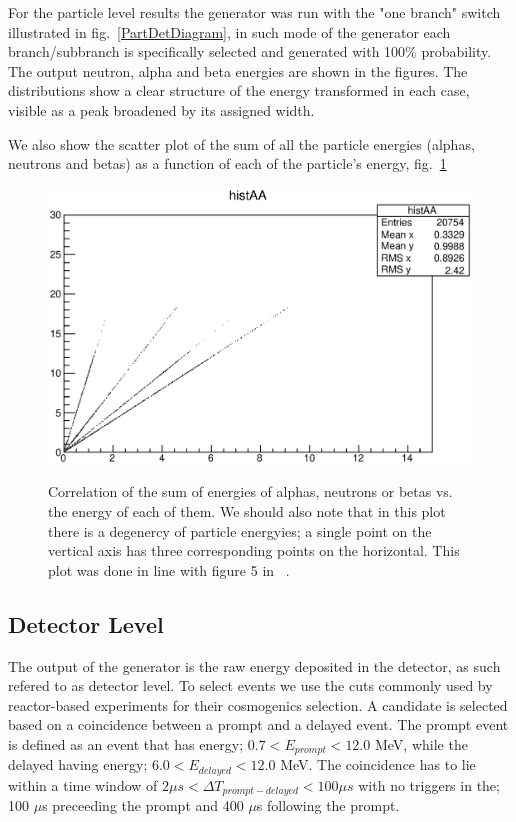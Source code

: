 \documentclass{JINST}
\begin{document}
       
       For the particle level results the generator was run with the "one branch" switch illustrated in fig.~\ref{PartDetDiagram},
       in such mode of the generator each branch/subbranch is specifically selected and generated with 100\% probability.
       The output neutron, alpha and beta energies are shown in the figures. The distributions show a clear structure of the energy transformed in each case, 
       visible as a peak broadened by its assigned width.%

       
       We also show the scatter plot of the sum of all the particle energies (alphas, neutrons and betas) as a function 
       of each of the particle's energy, fig.~\ref{histAA}
       
       \begin{figure}[htp]
    \begin{center}
  \includegraphics[scale=0.65]{histAA.eps}
   \label{histAA}
    \end{center}
    \caption{ Correlation of the sum of energies of alphas, neutrons or betas vs. the energy of each of them. We should also note that 
    in this plot there is a degenercy of particle energyies; a single point on the vertical axis has three corresponding points on the
    horizontal. This plot was done in line with figure 5 in ~\cite{Prezado200543}.}
 \end{figure}

   


\subsection{Detector Level}

       The output of the generator is the raw energy deposited in the detector, as such refered to as detector level. To select \liNINE events we use the 
       cuts commonly used by reactor-based experiments for their cosmogenics selection. A \liNINE candidate is selected based on a 
       coincidence between a prompt and a delayed event. The prompt event is defined as an event that has energy; $ 0.7 < E_{prompt} < 12.0$ MeV, while the 
       delayed having energy; $ 6.0 < E_{delayed} < 12.0$ MeV. The coincidence has to lie within a time window of $2 \mu s < \Delta T_{prompt-delayed} < 100 \mu s $
       with no triggers in the; 
       100 $\mu$s preceeding the prompt and 400 $\mu$s following the prompt.
       
\end{document}
